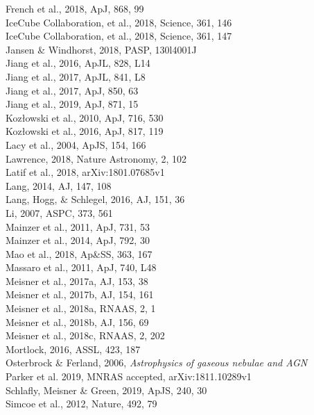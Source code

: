 \documentclass[12pt]{article}
\begin{document}
French et al., 2018, ApJ, 868, 99 \\
IceCube Collaboration, et al., 2018, Science, 361, 146 \\ 
IceCube Collaboration, et al., 2018, Science, 361, 147 \\
Jansen \& Windhorst, 2018, PASP, 130l4001J \\
Jiang et al., 2016, ApJL, 828, L14 \\
Jiang et al., 2017, ApJL, 841, L8\\ 	
Jiang et al., 2017, ApJ, 850, 63  \\
Jiang et al., 2019, ApJ, 871, 15 \\
Koz{\l}owski et al., 2010, ApJ, 716, 530 \\  
Koz{\l}owski et al., 2016, ApJ, 817, 119 \\
Lacy et al., 2004, ApJS, 154, 166 \\
Lawrence, 2018, Nature Astronomy, 2, 102 \\
Latif et al., 2018, arXiv:1801.07685v1 \\
Lang, 2014, AJ, 147, 108	\\
Lang, Hogg, \& Schlegel, 2016, AJ, 151, 36 \\
Li, 2007, ASPC, 373, 561\\
Mainzer et al., 2011, ApJ, 731, 53 \\
Mainzer et al., 2014, ApJ, 792, 30 \\
Mao et al., 2018,  Ap\&SS, 363, 167\\   %
Massaro et al., 2011, ApJ, 740, L48 \\ %
Meisner et al., 2017a, AJ, 153, 38 \\    
Meisner et al., 2017b, AJ, 154, 161 \\
Meisner et al., 2018a, RNAAS, 2, 1 \\
Meisner et al., 2018b, AJ, 156, 69 \\
Meisner et al., 2018c, RNAAS, 2, 202 \\
Mortlock, 2016, ASSL, 423, 187 \\
Osterbrock \& Ferland, 2006, {\it Astrophysics of gaseous nebulae and AGN}   \\ %
Parker et al. 2019, MNRAS accepted, arXiv:1811.10289v1 \\
Schlafly,  Meisner  \& Green, 2019, ApJS, 240, 30 \\
Simcoe et al., 2012, Nature, 492, 79 \\
\end{document}
